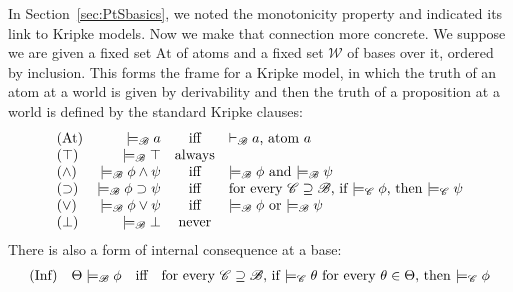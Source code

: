 \documentclass{sn-jnl}
\newcommand{\At}{\text{At}}
\newcommand{\derives}[1]{\vdash_{\!#1}}
\newcommand{\base}[1]{\mathscr{#1}}
\newcommand{\worlds}{\mathcal W}
\renewcommand{\derives}[2]{\vdash_{\base{#1}}#2}
\newcommand{\kripke}[2]{\models_{\base{#1}}#2}
\begin{document}
In Section~\ref{sec:PtSbasics}, we noted the monotonicity property and indicated its link to Kripke models. Now we make that connection more concrete. We suppose we are 
given a fixed set $\At$ of atoms and a fixed set $\worlds$ of bases over it, ordered by inclusion. This forms the frame for a Kripke model, in which the truth of an atom at a world is given by derivability and then the truth of a proposition at a world is defined by the standard Kripke clauses: 
\[ 
\begin{array}{lr@{\quad}c@{\quad}l}
    \mbox{$(\At)$} & \kripke{B}{a} & \mbox{iff} & 
    \mbox{$\derives{B}{a}$, atom $a$ } \\  
    \mbox{$(\top)$} & \kripke{B}{\top} & \mbox{always} &  \\  
    \mbox{$(\wedge)$} & \kripke{B}{\phi\wedge\psi} & \mbox{iff} &  
    \mbox{$\kripke{B}{\phi}$ and $\kripke{B}{\psi}$} \\
    \mbox{$(\supset)$} & \kripke{B}{\phi\supset\psi} & \mbox{iff} &  
    \mbox{for every $\base{C}\supseteq\base{B}$, if $\kripke{C}{\phi}$, 
    then $\kripke{C}{\psi}$}  \\ 
    \mbox{$(\vee)$} & \kripke{B}{\phi\vee\psi} & \mbox{iff} & \mbox{$\kripke{B}
    {\phi}$ or $\kripke{B}{\psi}$} \\ 
    \mbox{$(\bot)$} & \kripke{B}{\bot} & \mbox{never} &  \\ 
\end{array}
\]
There is also a form of internal consequence at a base:
\[ 
\begin{array}{lr@{\quad}c@{\quad}l}
\mbox{(Inf)} & \Theta\kripke{B}\phi & \mbox{iff} & 
\mbox{for every $\base{C}\supseteq\base{B}$, if $\kripke{C}{\theta}$ for every $\theta\in\Theta$, then $\kripke{C}\phi$}
\end{array}
\]
\end{document}
